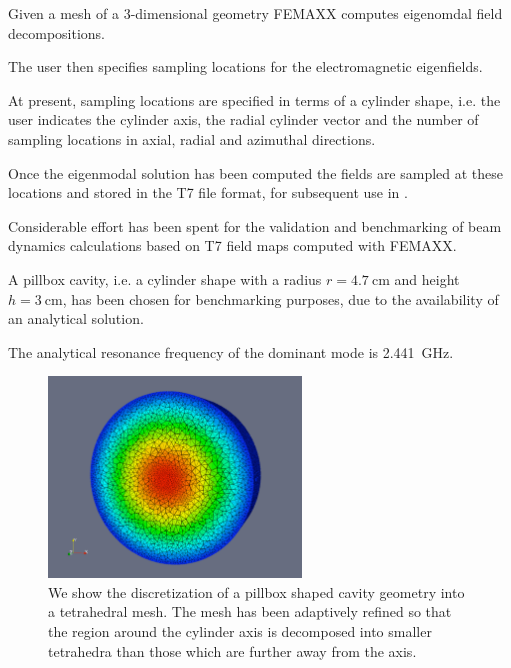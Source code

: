 Given a mesh of a $3$-dimensional geometry FEMAXX computes eigenomdal field
decompositions.

The user then specifies sampling locations for the electromagnetic eigenfields.

At present, sampling locations are specified in terms of a cylinder shape,
i.e. the user indicates the cylinder axis, the radial cylinder vector and
the number of sampling locations in axial, radial and azimuthal directions.

Once the eigenmodal solution has been computed the fields are sampled at
these locations and stored in the T7 file format, for subsequent use in \opal.

Considerable effort has been spent for the validation and benchmarking of
beam dynamics calculations based on T7 field maps computed with FEMAXX.

A pillbox cavity, i.e. a cylinder shape with a radius $r = \SI{4.7}{\centi\meter}$ and
height $h = \SI{3}{\centi\meter}$, has been chosen for benchmarking purposes,
due to the availability of an analytical solution.

The analytical resonance frequency of the dominant mode is \SI{2.441}{\giga\hertz}.


\begin{figure}[!htb]
\centering
\includegraphics[width=0.6\textwidth]{./figures/adaptivePillboxMesh.pdf}
\caption[Tetrahedral mesh of a pillbox shaped cavity]{We show the discretization of a pillbox shaped cavity geometry into a tetrahedral mesh. The mesh has been adaptively refined so that the region around the cylinder axis is decomposed into smaller tetrahedra than those which are further away from the axis.}
\label{fig:pillbox_adaptively_refined_mesh}
\end{figure}

